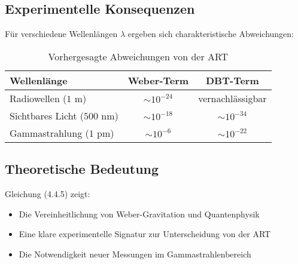 \subsection{Experimentelle Konsequenzen}
Für verschiedene Wellenlängen $\lambda$ ergeben sich charakteristische Abweichungen:

\begin{table}[h]
\centering
\begin{tabular}{lcc}
\toprule
Wellenlänge & Weber-Term & DBT-Term \\
\midrule
Radiowellen ($1$ m) & $\sim 10^{-24}$ & vernachlässigbar \\
Sichtbares Licht ($500$ nm) & $\sim 10^{-18}$ & $\sim 10^{-34}$ \\
Gammastrahlung ($1$ pm) & $\sim 10^{-6}$ & $\sim 10^{-22}$ \\
\bottomrule
\end{tabular}
\caption{Vorhergesagte Abweichungen von der ART}
\end{table}

\subsection{Theoretische Bedeutung}
Gleichung (4.4.5) zeigt:
\begin{itemize}
\item Die Vereinheitlichung von Weber-Gravitation und Quantenphysik
\item Eine klare experimentelle Signatur zur Unterscheidung von der ART
\item Die Notwendigkeit neuer Messungen im Gammastrahlenbereich
\end{itemize}

